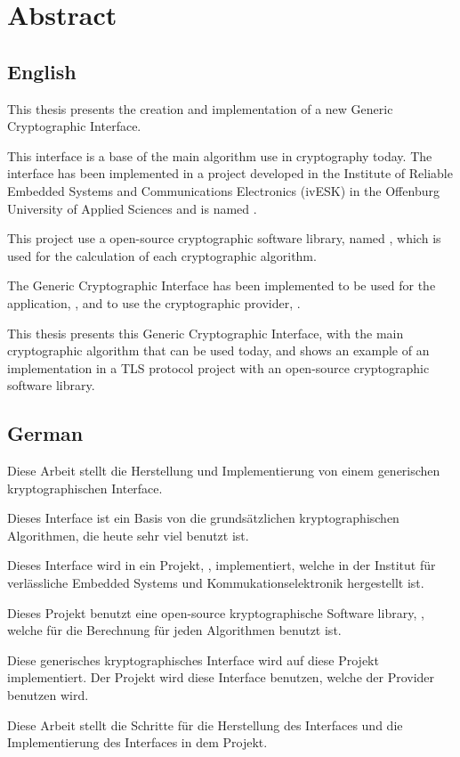 \chapter*{Abstract}

\section*{English}

This thesis presents the creation and implementation of a new Generic
Cryptographic Interface.

This interface is a base of the main algorithm use in cryptography today.
The interface has been implemented in a project developed in the Institute of Reliable
Embedded Systems and Communications Electronics (ivESK) in the Offenburg
University of Applied Sciences and is named \embtls.

This project use a open-source cryptographic software library, named
\tomcrypt, which is used for the calculation of each cryptographic algorithm.

The Generic Cryptographic Interface has been implemented to be used for the
application, \embtls, and to use the cryptographic provider, \tomcrypt.

This thesis presents this Generic Cryptographic Interface, with the main
cryptographic algorithm that can be used today, and shows an example of an
implementation in a TLS protocol project with an open-source
cryptographic software library.


 \section*{German}
Diese Arbeit stellt die Herstellung und Implementierung von einem generischen
kryptographischen Interface.

Dieses Interface ist ein Basis von die grunds\"{a}tzlichen kryptographischen
Algorithmen, die heute sehr viel benutzt ist.

Dieses Interface wird in ein Projekt, \embtls, implementiert, welche in der
Institut f\"{u}r verl\"{a}ssliche Embedded Systems und Kommukationselektronik
hergestellt ist.

Dieses Projekt benutzt eine open-source kryptographische Software library,
\tomcrypt, welche f\"{u}r die Berechnung f\"{u}r jeden Algorithmen benutzt
ist.

Diese generisches kryptographisches Interface wird auf diese
Projekt implementiert. Der \embtls Projekt wird diese Interface benutzen, welche
der \tomcrypt Provider benutzen wird.

Diese Arbeit stellt die Schritte f\"{u}r die Herstellung des Interfaces und die
Implementierung des Interfaces in dem \embtls Projekt.
